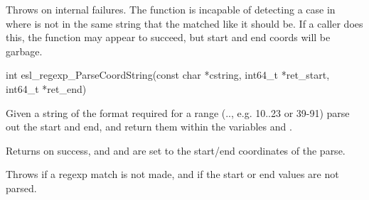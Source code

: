 \begin{sreapi}
Throws  on internal failures.
The function is incapable of detecting a case in
where  is not in the same string that the
 matched like it should be. If a caller does
this, the function may appear to succeed, but start and end  
coords will be garbage.


\hypertarget{func:esl_regexp_ParseCoordString()}
{\item[int esl\_regexp\_ParseCoordString(const char *cstring, int64\_t *ret\_start, int64\_t *ret\_end)]}

Given a string  of the format required for a
range (.., e.g. 10..23  or 39-91) parse out
the start and end, and return them within the variables
 and .

Returns  on success, and  and 
are set to the start/end coordinates of the parse.

Throws  if a regexp match is not made, and
 if the start or end values are not parsed.


\end{sreapi}

